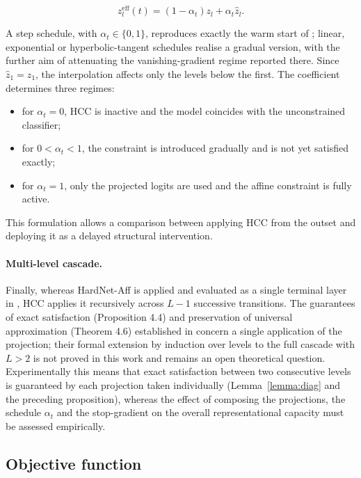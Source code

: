 \[
z_l^{\mathrm{eff}}(t)
=
(1-\alpha_t)z_l
+
\alpha_t\hat z_l .
\]

A step schedule, with $\alpha_t\in\{0,1\}$, reproduces exactly the warm start of \cite{min2024hardnet}; linear, exponential or hyperbolic-tangent schedules realise a gradual version, with the further aim of attenuating the vanishing-gradient regime reported there. Since $\hat z_1=z_1$, the interpolation affects only the levels below the first. The coefficient determines three regimes:

\begin{itemize}
    \item for $\alpha_t=0$, HCC is inactive and the model coincides with the unconstrained classifier;
    \item for $0<\alpha_t<1$, the constraint is introduced gradually and is not yet satisfied exactly;
    \item for $\alpha_t=1$, only the projected logits are used and the affine constraint is fully active.
\end{itemize}

This formulation allows a comparison between applying HCC from the outset and deploying it as a delayed structural intervention.

\paragraph{Multi-level cascade.} Finally, whereas HardNet-Aff is applied and evaluated as a single terminal layer in \cite{min2024hardnet}, HCC applies it recursively across $L-1$ successive transitions. The guarantees of exact satisfaction (Proposition 4.4) and preservation of universal approximation (Theorem 4.6) established in \cite{min2024hardnet} concern a single application of the projection; their formal extension by induction over levels to the full cascade with $L>2$ is not proved in this work and remains an open theoretical question. Experimentally this means that exact satisfaction between two consecutive levels is guaranteed by each projection taken individually (Lemma~\ref{lemma:diag} and the preceding proposition), whereas the effect of composing the projections, the schedule $\alpha_t$ and the stop-gradient on the overall representational capacity must be assessed empirically.

\subsection{Objective function}

